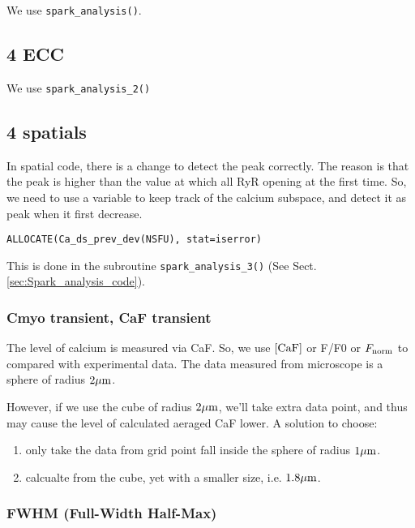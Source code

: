 We use \verb!spark_analysis()!.

\subsection{4 ECC}
\label{sec:ecc_spark-analysis}


We use \verb!spark_analysis_2()!	

\subsection{4 spatials}

 
In spatial code, there is a change to detect the peak correctly. The reason is
that the peak is higher than the value at which all RyR opening at the first
time. So, we need to use a variable to keep track of the calcium subspace, and
detect it as peak when it first decrease.
\begin{verbatim}
ALLOCATE(Ca_ds_prev_dev(NSFU), stat=iserror)
\end{verbatim}
This is done in the subroutine \verb!spark_analysis_3()! (See
Sect.\ref{sec:Spark_analysis_code}).


\subsubsection{Cmyo transient, CaF transient}
\label{sec:cmyo-caf_spatial}

The level of calcium is measured via CaF. So, we use $[\text{CaF}]$ or F/F0 or
$F_{\text{norm}}$ to compared with experimental data. The data measured from microscope
is a sphere of radius $2{\mu\text{m}}$. 

However, if we use the cube of radius $2{\mu\text{m}}$, we'll take extra data point, and
thus may cause the level of calculated aeraged CaF lower. A solution to choose:
\begin{enumerate}
  \item only take the data from grid point fall inside the sphere of radius
  $1{\mu\text{m}}$. 
  \item calcualte from the cube, yet with a smaller size, i.e. $1.8{\mu\text{m}}$.
\end{enumerate} 


\subsubsection{FWHM (Full-Width Half-Max)}
\label{sec:FWHM}
 

